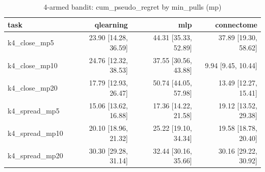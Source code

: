 \begin{table}[t]
\centering
\small
\begin{tabular}{lrrr}
\toprule
task & qlearning & mlp & connectome \\
\midrule
k4\_close\_mp5 & 23.90 [14.28, 36.59] & 44.31 [35.33, 52.89] & 37.89 [19.30, 58.62] \\
k4\_close\_mp10 & 24.76 [12.32, 38.53] & 37.55 [30.56, 43.88] & 9.94 [9.45, 10.44] \\
k4\_close\_mp20 & 17.79 [12.93, 26.47] & 50.74 [44.05, 57.98] & 13.49 [12.27, 15.41] \\
k4\_spread\_mp5 & 15.06 [13.62, 16.88] & 17.36 [14.22, 21.58] & 19.12 [13.52, 29.38] \\
k4\_spread\_mp10 & 20.10 [18.96, 21.32] & 25.22 [19.10, 34.34] & 19.58 [18.78, 20.40] \\
k4\_spread\_mp20 & 30.30 [29.28, 31.14] & 32.44 [30.16, 35.66] & 30.16 [29.22, 30.92] \\
\bottomrule
\end{tabular}
\caption{4-armed bandit: cum\_pseudo\_regret by min\_pulls (mp)}
\label{tab:bandit_multi_cum_pseudo_regret}
\end{table}
